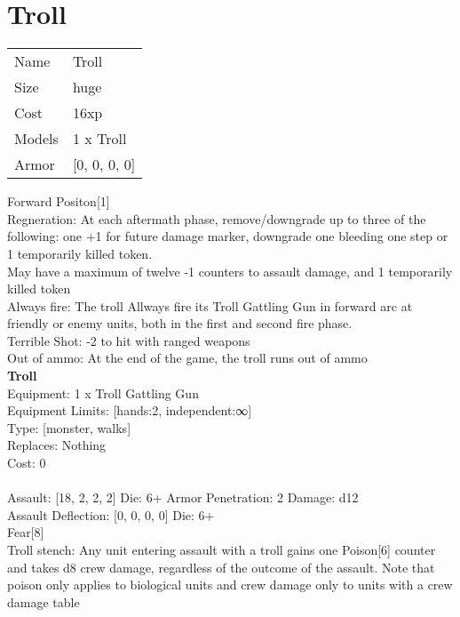 \pagebreak

\section{ Troll }

\begin{tabular}{ll}
  Name & Troll \\
  Size & huge\\
  Cost & 16xp\\
  Models & 1 x Troll\\
  Armor & [0, 0, 0, 0]\\
\end{tabular}

\noindent Forward Positon[1]\\ 
Regneration: At each aftermath phase, remove/downgrade up to three of the following: one +1 for future damage marker, downgrade one bleeding one step or 1 temporarily killed token.\\ 
May have a maximum of twelve -1 counters to assault damage, and 1 temporarily killed token\\ 
Always fire: The troll Allways fire its Troll Gattling Gun in forward arc at friendly or enemy units, both in the first and second fire phase.\\ 
Terrible Shot: -2 to hit with ranged weapons\\ 
Out of ammo: At the end of the game, the troll runs out of ammo\\ 


{\bf Troll } \\
Equipment: 1 x Troll Gattling Gun \\
Equipment Limits: [hands:2, independent:∞] \\
Type: [monster, walks] \\
Replaces: Nothing \\
Cost: 0\\
\ \\
Assault: [18, 2, 2, 2] Die: 6+ Armor Penetration: 2 Damage: d12 \\
Assault Deflection: [0, 0, 0, 0] Die: 6+\\
\indent Fear[8]\\ 
Troll stench: Any unit entering assault with a troll gains one Poison[6] counter and takes d8 crew damage, regardless of the outcome of the assault. Note that poison only applies to biological units and crew damage only to units with a crew damage table\\ 
 

